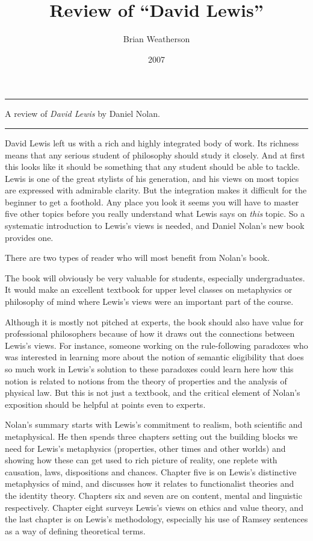 \documentclass[
  10pt,
  letterpaper,
  DIV=11,
  numbers=noendperiod,
  twoside]{scrartcl}
\title{Review of ``David Lewis''}
\author{Brian Weatherson}
\date{2007}
\renewenvironment{abstract}
 {\vspace{-1.25cm}
 \quotation\small\noindent\rule{\linewidth}{.5pt}\par\smallskip
 \noindent }
 {\par\noindent\rule{\linewidth}{.5pt}\endquotation}
\begin{document}
\maketitle
\begin{abstract}
A review of \emph{David Lewis} by Daniel Nolan.
\end{abstract}


David Lewis left us with a rich and highly integrated body of work. Its
richness means that any serious student of philosophy should study it
closely. And at first this looks like it should be something that any
student should be able to tackle. Lewis is one of the great stylists of
his generation, and his views on most topics are expressed with
admirable clarity. But the integration makes it difficult for the
beginner to get a foothold. Any place you look it seems you will have to
master five other topics before you really understand what Lewis says on
\emph{this} topic. So a systematic introduction to Lewis's views is
needed, and Daniel Nolan's new book provides one.

There are two types of reader who will most benefit from Nolan's book.

The book will obviously be very valuable for students, especially
undergraduates. It would make an excellent textbook for upper level
classes on metaphysics or philosophy of mind where Lewis's views were an
important part of the course.

Although it is mostly not pitched at experts, the book should also have
value for professional philosophers because of how it draws out the
connections between Lewis's views. For instance, someone working on the
rule-following paradoxes who was interested in learning more about the
notion of semantic eligibility that does so much work in Lewis's
solution to these paradoxes could learn here how this notion is related
to notions from the theory of properties and the analysis of physical
law. But this is not just a textbook, and the critical element of
Nolan's exposition should be helpful at points even to experts.

Nolan's summary starts with Lewis's commitment to realism, both
scientific and metaphysical. He then spends three chapters setting out
the building blocks we need for Lewis's metaphysics (properties, other
times and other worlds) and showing how these can get used to rich
picture of reality, one replete with causation, laws, dispositions and
chances. Chapter five is on Lewis's distinctive metaphysics of mind, and
discusses how it relates to functionalist theories and the identity
theory. Chapters six and seven are on content, mental and linguistic
respectively. Chapter eight surveys Lewis's views on ethics and value
theory, and the last chapter is on Lewis's methodology, especially his
use of Ramsey sentences as a way of defining theoretical terms.
\end{document}
